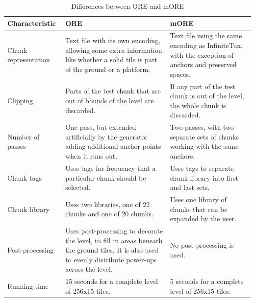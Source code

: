 \begin{table}[h]
    \caption{Differences between ORE and mORE}
    \label{table:ore-v-more}

    \begin{tabularx}{\textwidth}{| l | X | X |}
    \hline
    Characteristic & ORE & mORE\\
    \hline
    Chunk representation & Text file with its own encoding, allowing some extra information like whether a solid tile is part of the ground or a platform. & Text file using the same encoding as InfiniteTux, with the exception of anchors and preserved spaces.\\
    \hline
    Clipping & Parts of the test chunk that are out of bounds of the level are discarded. & If any part of the test chunk is out of the level, the whole chunk is discarded.\\
    \hline
    Number of passes & One pass, but extended artificially by the generator adding additional anchor points when it runs out. & Two passes, with two separate sets of chunks working with the same anchors.\\
    \hline
    Chunk tags & Uses tags for frequency that a particular chunk should be selected. & Uses tags to separate chunk library into first and last sets.\\
    \hline
    Chunk library & Uses two libraries, one of 22 chunks and one of 20 chunks. & Uses one library of chunks that can be expanded by the user.\\
    \hline
    Post-processing & Uses post-processing to decorate the level, to fill in areas beneath the ground tiles. It is also used to evenly distribute power-ups across the level. & No post-processing is used.\\
    \hline
    Running time & 15 seconds for a complete level of 256x15 tiles. & 5 seconds for a complete level of 256x15 tiles.\\
    \hline
\end{tabularx}
\end{table}

